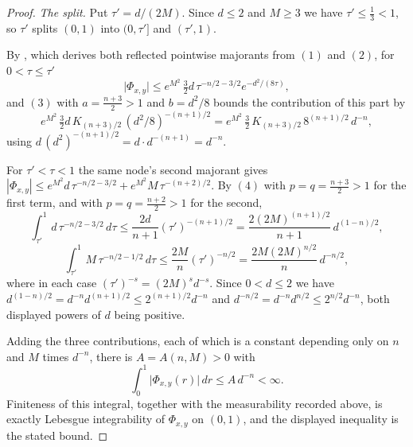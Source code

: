 \begin{proof}
\emph{The split.}
Put $\tau' = d/(2M)$.  Since $d \leq 2$ and $M \geq 3$ we have
$\tau' \leq \tfrac13 < 1$, so $\tau'$ splits $(0,1)$ into $(0,\tau']$ and
$(\tau',1)$.

By , which derives both
reflected pointwise majorants from $(1)$ and $(2)$, for $0 < \tau \leq \tau'$
\[
  \bigl|\Phi_{x,y}\bigr| \leq e^{M^2}\,\tfrac32 d\,\tau^{-n/2-3/2}
    e^{-d^2/(8\tau)} ,
\]
and $(3)$ with $a = \tfrac{n+3}{2} > 1$ and $b = d^2/8$ bounds the contribution of
this part by
\[
  e^{M^2}\,\tfrac32 d\,K_{(n+3)/2}\,(d^2/8)^{-(n+1)/2}
    = e^{M^2}\,\tfrac32\,K_{(n+3)/2}\,8^{(n+1)/2}\,d^{-n} ,
\]
using $d\,(d^2)^{-(n+1)/2} = d\cdot d^{-(n+1)} = d^{-n}$.

For $\tau' < \tau < 1$ the same node's second majorant gives
$|\Phi_{x,y}| \leq e^{M^2}d\,\tau^{-n/2-3/2} + e^{M^2}M\,\tau^{-(n+2)/2}$.
By $(4)$ with $p = q = \tfrac{n+3}{2} > 1$ for the first term, and with
$p = q = \tfrac{n+2}{2} > 1$ for the second,
\[
  \int_{\tau'}^1 d\,\tau^{-n/2-3/2}\,d\tau
    \leq \frac{2d}{n+1}(\tau')^{-(n+1)/2}
    = \frac{2(2M)^{(n+1)/2}}{n+1}\,d^{(1-n)/2} ,
\]
\[
  \int_{\tau'}^1 M\,\tau^{-n/2-1/2}\,d\tau
    \leq \frac{2M}{n}(\tau')^{-n/2}
    = \frac{2M(2M)^{n/2}}{n}\,d^{-n/2} ,
\]
where in each case $(\tau')^{-s} = (2M)^{s}d^{-s}$.  Since $0 < d \leq 2$ we have
$d^{(1-n)/2} = d^{-n}d^{(n+1)/2} \leq 2^{(n+1)/2}d^{-n}$ and
$d^{-n/2} = d^{-n}d^{n/2} \leq 2^{n/2}d^{-n}$, both displayed powers of $d$ being
positive.

Adding the three contributions, each of which is a constant depending only on $n$
and $M$ times $d^{-n}$, there is $A = A(n,M) > 0$ with
\[
  \int_0^1\bigl|\Phi_{x,y}(r)\bigr|\,dr \leq A\,d^{-n} < \infty .
\]
Finiteness of this integral, together with the measurability recorded above, is
exactly Lebesgue integrability of $\Phi_{x,y}$ on $(0,1)$, and the displayed
inequality is the stated bound.
\end{proof}
